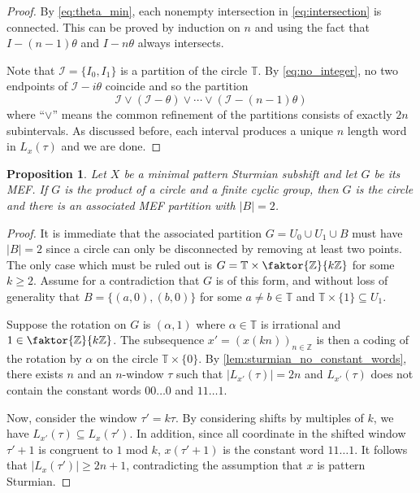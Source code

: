 \documentclass[11pt,reqno]{amsart}
\newtheorem{proposition}[theorem]{Proposition}
\theoremstyle{definition}
\theoremstyle{plain}
\newcommand{\Z}{\mathbb{Z}}
\newcommand{\T}{\mathbb{T}}
\begin{document}
\begin{proof}
By \eqref{eq:theta_min}, each nonempty intersection in \eqref{eq:intersection} is connected. This can be proved by induction on $n$ and using the fact that $I - (n-1) \theta$ and $I - n \theta$ always intersects.


Note that $\mathcal{I} = \{I_0, I_1\}$ is a partition of the circle $\T$.
By \eqref{eq:no_integer}, no two endpoints of $\mathcal{I} - i\theta$ coincide and so the partition 
\begin{equation}\label{eq:partition_big}
    \mathcal{I} \vee (\mathcal{I} - \theta) \vee \cdots \vee (\mathcal{I} - (n-1) \theta)
\end{equation}
where ``$\vee$'' means the common refinement of the partitions consists of exactly $2n$ subintervals. As discussed before, each interval produces a unique $n$ length word in $L_x(\tau)$ and we are done.
\end{proof}

\begin{proposition}\label{circcase}
Let $X$ be a minimal pattern Sturmian subshift and let $G$ be its MEF. If $G$ is the product of a circle and a finite cyclic group, then $G$ is the circle and there is an associated MEF partition with $|B| = 2$.
\end{proposition}
\begin{proof}
It is immediate that the associated partition $G = U_0 \cup U_1 \cup B$ must have $|B| = 2$ since a circle can only be disconnected by removing at least two points. The only case which must be ruled out is 
$G = \mathbb{T} \times \faktor{\Z}{k\Z}$ for some $k \geq 2$. Assume for a contradiction
that $G$ is of this form, and without loss of generality that $B = \{(a, 0), (b, 0)\}$ for some $a \neq b \in \mathbb{T}$ and $\mathbb{T} \times \{1\} \subseteq U_1$.

Suppose the rotation on $G$ is $(\alpha, 1)$ where $\alpha \in \T$ is irrational and $1 \in \faktor{\Z}{k\Z}$. The subsequence $x' = (x(kn))_{n \in \mathbb{Z}}$ is then a coding of the rotation by $\alpha$ on the circle $\T \times \{0\}$. By \cref{lem:sturmian_no_constant_words}, there exists $n$ and an $n$-window $\tau$ such that $|L_{x'}(\tau)| = 2n$ and $L_{x'}(\tau)$ does not contain the constant words $00 \ldots 0$ and $11 \ldots 1$. 

Now, consider the window $\tau' = k\tau$. By considering shifts by multiples of $k$, we have $L_{x'}(\tau) \subseteq L_x(\tau')$. In addition, since all coordinate in the shifted window $\tau' + 1$ is congruent to $1$ mod $k$, $x(\tau' + 1)$ is the constant word $11 \ldots 1$. It follows that $|L_x(\tau')| \geq 2n + 1$, contradicting the assumption that $x$ is pattern Sturmian.
\end{proof}
\end{document}
